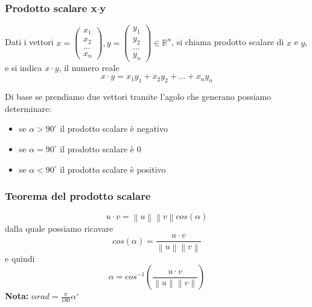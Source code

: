 \documentclass[../main.tex]{subfiles}
\begin{document}
\vspace{1.5cm}
\subsubsection{Prodotto scalare x$\cdot$y}
Dati i vettori $x = \begin{pmatrix}x_1 \\ x_2 \\ ... \\ x_n \end{pmatrix}, y = \begin{pmatrix}y_1 \\ y_2 \\ ... \\ y_n \end{pmatrix} \in \mathbb{R}^n$,
si chiama prodotto scalare di $x$ e $y$, e si indica $x \cdot y$, il numero reale
$$
    x \cdot y = x_1y_1 + x_2y_2 + ... + x_ny_n
$$

Di base se prendiamo due vettori tramite l'agolo che generano possiamo determinare:
\begin{itemize}
    \item se $\alpha > 90^{\circ}$ il prodotto scalare è negativo
    \item se $\alpha = 90^{\circ}$ il prodotto scalare è $0$
    \item se $\alpha < 90^{\circ}$ il prodotto scalare è positivo
\end{itemize}

\vspace{1cm}
\subsubsection{Teorema del prodotto scalare}
$$
   u \cdot v = \left\lVert u \right\rVert \left\lVert v \right\rVert cos(\alpha)
$$
dalla quale possiamo ricavare
$$
    cos(\alpha) = \frac{u \cdot v}{\left\lVert u\right\rVert \left\lVert v\right\rVert }
$$
e quindi
$$
    \alpha = cos^{-1}\left( \frac{u \cdot v}{\left\lVert u \right\rVert \left\lVert v \right\rVert } \right)
$$
\textbf{Nota:} $\alpha rad = \frac{\pi}{180} \alpha^\circ $

\vspace{1.5cm}
\end{document}
